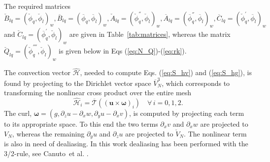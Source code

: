 \documentclass[11pt, oneside]{elsarticle}
\newcommand{\N}[1]{\check{#1}}
\newcommand{\D}[1]{\overline{#1}}
\begin{document}
The required matrices $ \N{B}_{lq} = \left( \N{\phi}_q, 
\N{\phi}_l\right)_w, \D{B}_{lq} = \left( \D{\phi}_q, 
\D{\phi}_l\right)_w, \N{A}_{lq} = \left( \N{\phi}_q^{''}, 
\N{\phi}_l\right)_w, 
\D{A}_{lq} = \left( \D{\phi}_q^{''}, \D{\phi}_l\right)_w 
, \D{C}_{lq} = \left(\N{\phi}_q^{'}, \D{\phi}_l\right)_w$ and 
$ \N{C}_{lq} = \left(\D{\phi}_q^{'}, \N{\phi}_l\right)_w$ are given in Table~\ref{tab:matrices}, whereas the matrix $\N{Q}_{lq} = \left(\N{\phi}^{''''}_q, \N{\phi}_l\right)_w$ is given below in Eqs (\ref{eq:N_Q})-(\ref{eq:rk}). 

The convection vector $\bm{\hat{\mathcal{H}}}$, needed to compute Eqs. (\ref{eq:S_hv}) and (\ref{eq:S_hg}), is found by projecting to the Dirichlet vector space $\D{V}_N^3$, which corresponds to transforming the nonlinear cross product over the entire mesh
\begin{equation}
\bm{\hat{\mathcal{H}}}_i = \mathcal{\D{T}}((\bm{u} \times \bm{\omega})_i) \quad \forall \, i=0,1,2. \label{eq:H_hat}
\end{equation}
The curl, $\bm{\omega} = (g, \partial_z u - \partial_x w, \partial_y u - \partial_x v)$, is computed by projecting each term to its appropriate space. To this end the two terms $\partial_x v$ and $\partial_x w$ are projected to $V_N$, whereas the remaining $\partial_y u$ and $\partial_z u$ are projected to $\N{V}_N$. The nonlinear term is also in need of dealiasing. In this work dealiasing has been performed with the 3/2-rule, see Canuto~et al. \cite{canuto1988}.
\end{document}
